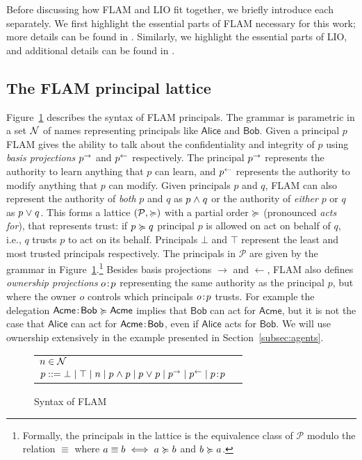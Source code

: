 Before discussing how FLAM and LIO fit together, we briefly introduce each separately. We first highlight the essential parts of FLAM necessary for this work; more details can be found in \cite{Arden:2015:FA:2859845.2859998}. Similarly, we highlight the essential parts of LIO, and additional details can be found in \cite{SRMMlio}.

\subsection{The FLAM principal lattice}
Figure~\ref{fig:flam-syntax} describes the syntax of FLAM principals. The grammar is parametric in a set $\mathcal{N}$ of names representing principals like $\mathsf{Alice}$ and $\mathsf{Bob}$. Given a principal $p$ FLAM gives the ability to talk about the confidentiality and integrity of $p$ using \emph{basis projections} $p^{\rightarrow}$ and $p^{\leftarrow}$ respectively. The principal $p^{\rightarrow}$ represents the authority to learn anything that $p$ can learn, and $p^{\leftarrow}$ represents the authority to modify anything that $p$ can modify. Given principals $p$ and $q$, FLAM can also represent the authority of \emph{both} $p$ and $q$ as $p \mathrel{\land} q$ or the authority of \emph{either} $p$ or $q$ as $p \mathrel{\lor} q$. This forms a lattice $(\mathcal{P}, \succcurlyeq)$ with a partial order $\succcurlyeq$ (pronounced \emph{acts for}), that represents trust: if $p \succcurlyeq q$ principal $p$ is allowed on act on behalf of $q$, i.e., $q$ trusts $p$ to act on its behalf. Principals $\bot$ and $\top$ represent the least and most trusted principals respectively. The principals in $\mathcal{P}$ are given by the grammar in Figure~\ref{fig:flam-syntax}.\footnote{Formally, the principals in the lattice is the equivalence class of $\mathcal{P}$ modulo the relation $\equiv$ where $a \equiv b \iff a \succcurlyeq b$ and $b \succcurlyeq a$.} Besides basis projections $\rightarrow$ and $\leftarrow$, FLAM also defines \emph{ownership projections} $o\!:\!p$ representing the same authority as the principal $p$, but where the owner $o$ controls which principals $o\!:\!p$ trusts. For example the delegation $\mathsf{Acme}\!:\!\mathsf{Bob} \succcurlyeq \mathsf{Acme}$ implies that $\mathsf{Bob}$ can act for $\mathsf{Acme}$, but it is not the case that $\mathsf{Alice}$ can act for $\mathsf{Acme}\!:\!\mathsf{Bob}$, even if $\mathsf{Alice}$ acts for $\mathsf{Bob}$. We will use ownership extensively in the example presented in Section~\ref{subsec:agents}.

\begin{figure}
    \centering
    \begin{tabular}{ll}
    $n \in \mathcal{N}$ \\
    $p ::= \bot \mid \top \mid n \mid p \mathrel{\land} p \mid p \mathrel{\lor} p \mid p^{\rightarrow} \mid p^{\leftarrow} \mid p\!:\!p$
    \end{tabular}
    \caption{Syntax of FLAM}
    \label{fig:flam-syntax}
\end{figure}


